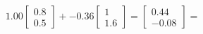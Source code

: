 \documentclass[preview]{standalone}
\begin{document}
\begin{align*}
1.00 \begin{bmatrix} 0.8 \\ 0.5 \end{bmatrix} + -0.36 \begin{bmatrix} 1 \\ 1.6 \end{bmatrix} = \begin{bmatrix} 0.44 \\ -0.08 \end{bmatrix} =
\end{align*}
\end{document}
